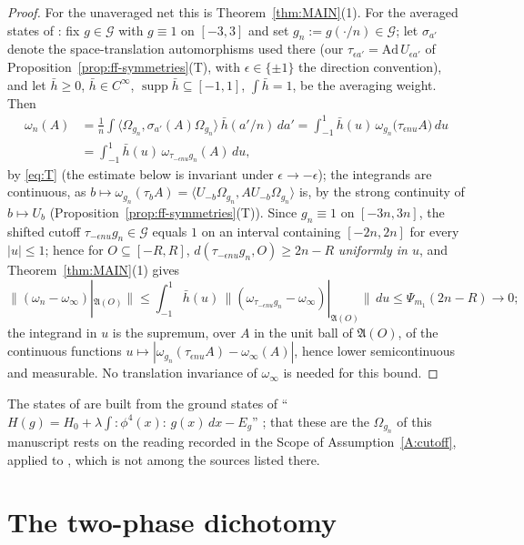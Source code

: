 \documentclass[11pt,a4paper]{article}
\theoremstyle{plain}
\theoremstyle{definition}
\theoremstyle{plain}
\theoremstyle{definition}
\newcommand{\A}{\mathfrak{A}}
\newcommand{\G}{\mathcal{G}}
\newcommand{\Om}{\Omega}
\newcommand{\ip}[2]{\langle #1,#2\rangle}
\DeclareMathOperator{\supp}{supp}
\begin{document}
\begin{proof}
For the unaveraged net this is Theorem~\ref{thm:MAIN}(1). For the averaged states of
\cite[(2.3)--(2.5)]{GJ3}: fix $g\in\G$ with $g\equiv1$ on $[-3,3]$ and set
$g_n:=g(\cdot/n)\in\G$; let $\sigma_{a'}$ denote the space-translation automorphisms
used there (our $\tau_{\epsilon a'}=\mathrm{Ad}\,U_{\epsilon a'}$ of
Proposition~\ref{prop:ff-symmetries}(T), with $\epsilon\in\{\pm1\}$ the direction
convention), and let $\bar h\ge0$, $\bar h\in C^\infty$, $\supp\bar h\subseteq[-1,1]$, $\int\bar h=1$, be the
averaging weight. Then
\begin{align*}
  \omega_n(A)
  &=\frac1n\int\ip{\Om_{g_n}}{\sigma_{a'}(A)\Om_{g_n}}\,
      \bar h(a'/n)\,da'
  =\int_{-1}^{1}\bar h(u)\,\omega_{g_n}\bigl(\tau_{\epsilon nu}A\bigr)\,du\\
  &=\int_{-1}^{1}\bar h(u)\,\omega_{\tau_{-\epsilon nu}g_n}(A)\,du ,
\end{align*}
by \eqref{eq:T} (the estimate below is invariant under $\epsilon\to-\epsilon$); the integrands
are continuous, as $b\mapsto\omega_{g_n}(\tau_bA)=\ip{U_{-b}\Om_{g_n}}{AU_{-b}\Om_{g_n}}$ is, by
the strong continuity of $b\mapsto U_b$ (Proposition~\ref{prop:ff-symmetries}(T)). Since
$g_n\equiv1$ on $[-3n,3n]$, the shifted cutoff $\tau_{-\epsilon nu}g_n\in\G$ equals $1$
on an interval containing $[-2n,2n]$ for every $|u|\le1$; hence for $O\subseteq[-R,R]$,
$d(\tau_{-\epsilon nu}g_n,O)\ge2n-R$ \emph{uniformly in $u$}, and
Theorem~\ref{thm:MAIN}(1) gives
\[
  \|(\omega_n-\omega_\infty)|_{\A(O)}\|
  \le\int_{-1}^1\bar h(u)\,\bigl\|(\omega_{\tau_{-\epsilon nu}g_n}-\omega_\infty)|_{\A(O)}\bigr\|\,du
  \le\Psi_{m_1}(2n-R)\longrightarrow0 ;
\]
the integrand in $u$ is the supremum, over $A$ in the unit ball of $\A(O)$, of the continuous
functions $u\mapsto|\omega_{g_n}(\tau_{\epsilon nu}A)-\omega_\infty(A)|$, hence lower
semicontinuous and measurable.  No translation invariance of $\omega_\infty$ is needed for this
bound.
\end{proof}

The states of \cite{GJ3} are built from the ground states of
``$H(g)=H_0+\lambda\int{:}\phi^4(x){:}\,g(x)\,dx-E_g$'' \cite[(1.10), p.~205]{GJ3}; that these
are the $\Om_{g_n}$ of this manuscript rests on the reading recorded in the Scope of
Assumption~\ref{A:cutoff}, applied to \cite{GJ3}, which is not among the sources listed there.

\section{The two-phase dichotomy}\label{sec:dichotomy}
\end{document}
